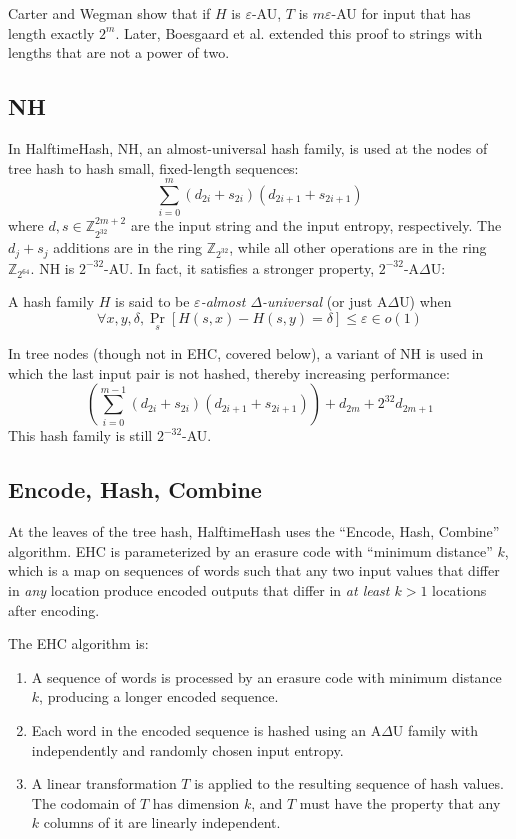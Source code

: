\documentclass{llncs}
\newcommand{\ints}{\mathbb{Z}}
\begin{document}
Carter and Wegman show that if $H$ is $\varepsilon$-AU, $T$ is $m\varepsilon$-AU for input that has length exactly $2^m$.
Later, Boesgaard et al. extended this proof to strings with lengths that are not a power of two.\cite{badger}

\subsection{NH}

In HalftimeHash, NH, an almost-universal hash family, is used at the nodes of tree hash to hash small, fixed-length sequences:\cite{umac}
\[
\sum_{i=0}^m (d_{2i} + s_{2i})(d_{2i+1} + s_{2i+1})
\]
where $d, s \in \ints_{2^{32}}^{2m+2}$ are the input string and the input entropy, respectively.
The $d_j + s_j$ additions are in the ring $\ints_{2^{32}}$, while all other operations are in the ring $\ints_{2^{64}}$.
NH is $2^{-32}$-AU.
In fact, it satisfies a stronger property, $2^{-32}$-A$\Delta$U:\cite{umac}

\begin{definition}
  A hash family $H$ is said to be {\em $\varepsilon$-almost $\Delta$-universal} (or just A$\Delta$U) when
  \[
  \forall x,y,\delta, \Pr_s[H(s,x) - H(s,y) = \delta] \leq \varepsilon \in o(1)
  \]
\end{definition}

In tree nodes (though not in EHC, covered below), a variant of NH is used in which the last input pair is not hashed, thereby increasing performance:
\[
\left(\sum_{i=0}^{m-1} (d_{2i} + s_{2i})(d_{2i+1} + s_{2i+1})\right) + d_{2m} + 2^{32} d_{2m+1}
\]
This hash family is still $2^{-32}$-AU.\cite{badger}

\subsection{Encode, Hash, Combine}

At the leaves of the tree hash, HalftimeHash uses the ``Encode, Hash, Combine'' algorithm.\cite{ehc-nandi}
EHC is parameterized by an erasure code with ``minimum distance'' $k$, which is a map on sequences of words such that any two input values that differ in {\em any} location produce encoded outputs that differ in {\em at least $k > 1$} locations after encoding.

The EHC algorithm is:
\begin{enumerate}
\item A sequence of words is processed by an erasure code with minimum distance $k$, producing a longer encoded sequence.
\item Each word in the encoded sequence is hashed using an A$\Delta$U family with independently and randomly chosen input entropy.
\item A linear transformation $T$ is applied to the resulting sequence of hash values.
  The codomain of $T$ has dimension $k$, and $T$ must have the property that any $k$ columns of it are linearly independent.
\end{enumerate}
\end{document}
